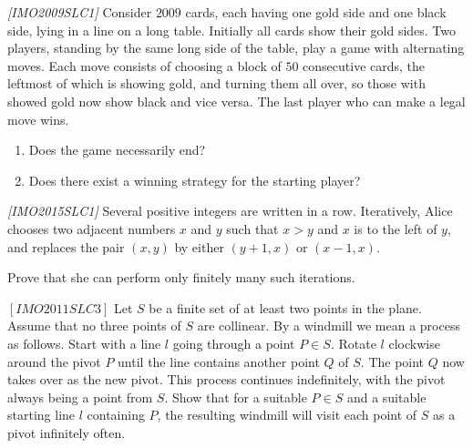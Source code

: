 

%

\renewcommand{\theenumi}{\alph{enumi}}




\noindent
 
\filbreak

\begin{problem}
\textit{[IMO2009SLC1]}
Consider $2009$ cards, each having one gold side and one black side, lying in a line on a long table. Initially all cards show their gold sides. Two players, standing by the same long side of the table, play a game with alternating moves. Each move consists of choosing a block of $50$ consecutive cards, the leftmost of which is showing gold, and turning them all over, so those with showed gold now show black and vice versa. The last player who can make a legal move wins.
\begin{enumerate}
\item Does the game necessarily end?
\item Does there exist a winning strategy for the starting player?
\end{enumerate}

\end{problem}
%



\begin{problem}
\textit{[IMO2015SLC1]}
Several positive integers are written in a row. Iteratively, Alice chooses two adjacent numbers $x$ and $y$ such that $x > y$ and $x$ is to the left of $y$, and replaces the pair $(x,y)$ by either $(y + 1,x)$ or $(x − 1,x)$. 

Prove that she can perform only ﬁnitely many such iterations.
\end{problem}

\begin{problem}
$[IMO2011SLC3]$
Let $S$ be a ﬁnite set of at least two points in the plane. Assume that no three points of $S$ are collinear. By a windmill we mean a process as follows. Start with a line $l$ going through a point $P \in S$. Rotate $l$ clockwise around the pivot $P$ until the line contains another point $Q$ of $S$. The point $Q$ now takes over as the new pivot. This process continues indeﬁnitely, with the pivot always being a point from $S$. Show that for a suitable $P \in S$ and a suitable starting line $l$ containing $P$, the resulting windmill will visit each point of $S$ as a pivot inﬁnitely often.

\end{problem}

